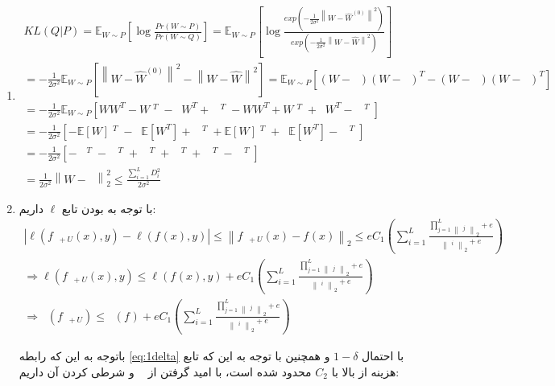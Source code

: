 \documentclass{article}
\DeclareMathOperator{\Wp}{\hat{W}^{(0)}}
\DeclareMathOperator{\Wh}{\hat{W}}
\DeclareMathOperator{\Lossh}{\hat{\mathcal{L}}}
\begin{document}
\begin{enumerate}
    \item 
   \begin{align*}
    KL(Q|P) = \mathbb{E}_{W\sim P}[\log
    \frac
    {Pr(W\sim P)}
    {Pr(W\sim Q)}]
    = \mathbb{E}_{W\sim P}[\log
    \frac
    {exp (-\frac{1}{2\sigma^2} \left\lVert W - \hat{W}^{(0)} \right\rVert^2)}
    {
    exp (-\frac{1}{2\sigma^2} \left\lVert W - \hat{W}\right\rVert^2)}
    ] \\ 
    = 
    -\frac{1}{2\sigma^2} \mathbb{E}_{W\sim P}
    [
    \left\lVert W - \hat{W}^{(0)} \right\rVert^2
    - \left\lVert W - \hat{W} \right\rVert^2
    ]
    =
    \mathbb{E}_{W\sim P}
    [
    (W - \Wp)(W - \Wp)^T- (W - \Wh)(W - \Wh)^T 
    ]
    \\ =
    -\frac{1}{2\sigma^2} \mathbb{E}_{W\sim P}
    [
    WW^T - W\Wp^T - \Wp W^T + \Wp\Wp^T - WW^T + W\Wh^T + \Wh W^T - \Wh\Wh^T
    ]\\
    =-\frac{1}{2\sigma^2}[ -\mathbb{E}[W]\Wp^T - \Wp \mathbb{E}[W^T] + \Wp\Wp^T + \mathbb{E}[W]\Wh^T + \Wh \mathbb{E}[W^T] - \Wh\Wh^T]
    \\
    = -\frac{1}{2\sigma^2} [-\Wp\Wp^T - \Wp \Wp^T + \Wp\Wp^T + \Wp\Wh^T + \Wh \Wp^T - \Wh\Wh^T] \\ 
    = \frac{1}{2\sigma^2} \left\lVert W - \Wp \right\rVert_2^2
    \leq \frac{\sum_{i=1}^{L}D_i^2}{2\sigma^2}
\end{align*} 


\item
با توجه به 
بودن تابع 
$\ell$
داریم:
   \begin{align*}
     |\ell(f_{\Wh+U}(x),y) - \ell(f_{\Wh}(x),y)| \leq  \left\lVert f_{\Wh+U}(x) - f_{\Wh}(x) \right\rVert_2 \leq e C_1 
    (\sum_{i=1}^L
    \frac
    {\prod_{j=1}^{L}\left\lVert {\Wh}_j \right\rVert_2+e}
    {\left\lVert {\Wh}_i \right\rVert_2+e}
    )\\
    \Rightarrow 
    \ell(f_{\Wh+U}(x),y) \leq \ell(f_{\Wh}(x),y) + e C_1 
    (\sum_{i=1}^L
    \frac
    {\prod_{j=1}^{L}\left\lVert {\Wh}_j \right\rVert_2+e}
    {\left\lVert {\Wh}_i \right\rVert_2+e}
    )\\
    \Rightarrow 
    \Lossh(f_{\Wh + U}) \leq \Lossh(f_{\Wh}) + e C_1 
    (\sum_{i=1}^L
    \frac
    {\prod_{j=1}^{L}\left\lVert {\Wh}_j \right\rVert_2+e}
    {\left\lVert {\Wh}_i \right\rVert_2+e}
    )
\end{align*} 

باتوجه به این که رابطه 
\ref{eq:1delta}
با احتمال 
$1-\delta$
و همچنین با توجه به این که تابع هزینه از بالا با 
$C_2$
محدود شده است، 
با امید گرفتن از 
$\Lossh$
و شرطی کردن آن داریم:


\end{enumerate}
\end{document}
